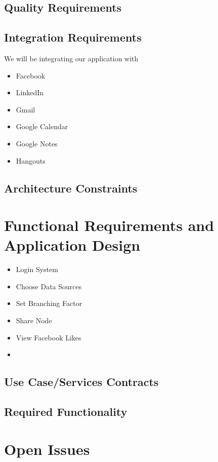 \documentclass[a4paper]{article}
\begin{document}
	\subsection{Quality Requirements}
	
	
	\subsection{Integration Requirements}
	We will be integrating our application with
	\begin{itemize}
	    \item Facebook
	    \item LinkedIn
	    \item Gmail
	    \item Google Calendar
	    \item Google Notes
	    \item Hangouts
	\end{itemize}
	
	\subsection{Architecture Constraints}

	\pagebreak
	\section{Functional Requirements and Application Design}

    \begin{itemize}
        \item Login System
        \item Choose Data Sources
        \item Set Branching Factor
        \item Share Node
        \item View Facebook Likes
        \item
    \end{itemize}
    
	
	\subsection{Use Case/Services Contracts}


  
	
    \pagebreak

	
	\subsection{Required Functionality}

	\pagebreak
	\section{Open Issues}
	
		
\end{document}
